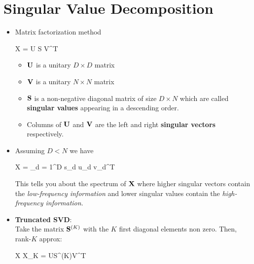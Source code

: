 
\section{Singular Value Decomposition}
\begin{itemize}
	\item Matrix factorization method
	\begin{myalign*}
	    \*X = \*U \*S \*V^T
	\end{myalign*}
	\begin{itemize}
		\item $\mathbf{U}$ is a unitary $D \times D$ matrix
		\item $\mathbf{V}$ is a unitary $N \times N$ matrix
		\item $\mathbf{S}$ is a non-negative diagonal matrix of size $D \times N$ which are called \textbf{singular values} appearing in a descending order.
		\item Columns of $\mathbf{U}$ and $\mathbf{V}$ are the left and right \textbf{singular vectors} respectively.
	\end{itemize}
	\item Assuming $D < N$ we have
	\begin{myalign*}
	    \*X = \sum_{d = 1}^D s_d \*u_d \*v_d^T
	\end{myalign*}
	This tells you about the spectrum of $\mathbf{X}$ where higher singular vectors contain the \textit{low-frequency information} and lower singular values contain the \textit{high-frequency information}. 
	\item {\bf Truncated SVD}: \\
	Take the matrix $\mathbf{S}^{(K)}$ with the $K$ first diagonal elements non zero. Then, rank-$K$ approx:	
	\begin{myalign*}
		\*X \approx \*X_K = \*U\*S^{(K)}\*V^T
	\end{myalign*}
	
\end{itemize}

